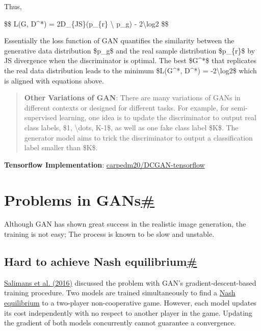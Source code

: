 Thus,

\$\$ L(G, D\^{}*) = 2D\_\{JS\}(p\_\{r\} \textbackslash\textbar{} p\_g) - 2\textbackslash log2 \$\$

Essentially the loss function of GAN quantifies the similarity between the generative data distribution \$p\_g\$ and the real sample distribution \$p\_\{r\}\$ by JS divergence when the discriminator is optimal. The best \$G\^{}*\$ that replicates the real data distribution leads to the minimum \$L(G\^{}*, D\^{}*) = -2\textbackslash log2\$ which is aligned with equations above.

\begin{quote}
\textbf{Other Variations of GAN}: There are many variations of GANs in different contexts or designed for different tasks. For example, for semi-supervised learning, one idea is to update the discriminator to output real class labels, \$1, \textbackslash dots, K-1\$, as well as one fake class label \$K\$. The generator model aims to trick the discriminator to output a classification label smaller than \$K\$.
\end{quote}

\textbf{Tensorflow Implementation}: \href{https://github.com/carpedm20/DCGAN-tensorflow}{carpedm20/DCGAN-tensorflow}

\section{\texorpdfstring{Problems in GANs\hyperref[problems-in-gans]{\#}}{Problems in GANs\#}}\label{problems-in-gans}

Although GAN has shown great success in the realistic image generation, the training is not easy; The process is known to be slow and unstable.

\subsection{\texorpdfstring{Hard to achieve Nash equilibrium\hyperref[hard-to-achieve-nash-equilibrium]{\#}}{Hard to achieve Nash equilibrium\#}}\label{hard-to-achieve-nash-equilibrium}

\href{http://papers.nips.cc/paper/6125-improved-techniques-for-training-gans.pdf}{Salimans et al. (2016)} discussed the problem with GAN's gradient-descent-based training procedure. Two models are trained simultaneously to find a \href{https://en.wikipedia.org/wiki/Nash_equilibrium}{Nash equilibrium} to a two-player non-cooperative game. However, each model updates its cost independently with no respect to another player in the game. Updating the gradient of both models concurrently cannot guarantee a convergence.

